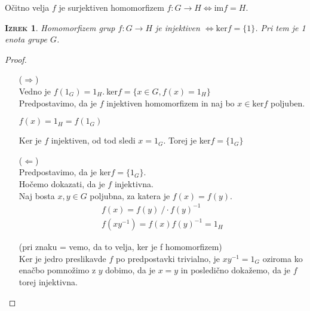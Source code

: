 \documentclass[a4paper,12pt]{article}
\newtheorem*{izrek}{\textsc{Izrek}}
\begin{document}
\newpage 

\noindent Očitno velja $f$ je surjektiven homomorfizem $f:G\to H \Leftrightarrow \text{im}f=H$.\\

\begin{izrek}
Homomorfizem grup $f:G \to H$ je injektiven $\Leftrightarrow \text{ker}f=\{ 1 \} $. Pri tem je 1 enota grupe $G$. \\
\end{izrek}

\begin{proof}
~\\
\begin{itemize}
\item[($\Rightarrow$)] ~ \\

Vedno je $f(1_G)=1_H.~ $ker$f=\{x\in G,f(x)=1_H\}$ \\

\noindent Predpostavimo, da je $f$ injektiven homomorfizem in naj bo $x\in \text{ker}f$ poljuben. 
\begin{center}
$f(x)=1_H=f(1_G)$ 
\end{center}
Ker je $f$ injektiven, od tod sledi $x=1_G$. Torej je ker$f=\{1_G\}$ \\

\item[($\Leftarrow$)] ~ \\

Predpostavimo, da je ker$f=\{1_G\}$. \\

Hočemo dokazati, da je $f$ injektivna. \\

\noindent Naj bosta $x,y\in G$ poljubna, za katera je $f(x)=f(y)$. 
\begin{gather*}
f(x)=f(y)~/\cdot f(y)^{-1} \\
f(xy^{-1})=f(x)f(y)^{-1}=1_H
\end{gather*}

\noindent (pri znaku = vemo, da to velja, ker je f homomorfizem) \\

\noindent Ker je jedro preslikavde $f$ po predpostavki trivialno, je $xy^{-1}=1_G$ oziroma ko enačbo pomnožimo z $y$ dobimo, da je $x=y$ in posledično dokažemo, da je $f$ torej injektivna.\\
\end{itemize}
\end{proof}

\newpage 
\end{document}

